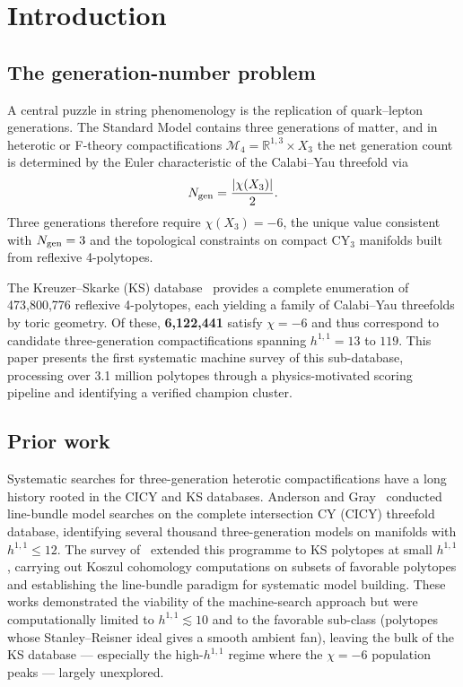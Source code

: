 \documentclass[11pt,a4paper]{article}
\newcommand{\bR}{\mathbb{R}}
\begin{document}
\section{Introduction}
\label{sec:intro}

\subsection{The generation-number problem}

A central puzzle in string phenomenology is the replication of
quark--lepton generations.
The Standard Model contains three generations of matter, and
in heterotic or F-theory compactifications
$\mathcal{M}_{4} = \bR^{1,3}\times X_3$
the net generation count is determined by the Euler characteristic
of the Calabi--Yau threefold via
\begin{equation}
  N_{\rm gen} = \frac{|\chi(X_3)|}{2}.
  \label{eq:ngen}
\end{equation}
Three generations therefore require $\chi(X_3) = -6$, the unique
value consistent with $N_{\rm gen} = 3$ and the topological
constraints on compact CY$_3$ manifolds built from
reflexive 4-polytopes.

The Kreuzer--Skarke (KS) database~\cite{KS2000} provides a
complete enumeration of 473,800,776 reflexive 4-polytopes, each
yielding a family of Calabi--Yau threefolds by toric geometry.
Of these, \textbf{6,122,441} satisfy $\chi = -6$ and thus
correspond to candidate three-generation compactifications
spanning $h^{1,1} = 13$ to $119$.
This paper presents the first systematic machine survey of this
sub-database, processing over 3.1 million polytopes through a
physics-motivated scoring pipeline and identifying a verified
champion cluster.

\subsection{Prior work}

Systematic searches for three-generation heterotic compactifications
have a long history rooted in the CICY and KS databases.
Anderson and Gray~\cite{AndersonGray2012} conducted line-bundle
model searches on the complete intersection CY (CICY) threefold
database, identifying several thousand three-generation models on
manifolds with $h^{1,1} \leq 12$.
The survey of~\cite{AGLP2014} extended this programme to KS polytopes
at small $h^{1,1}$, carrying out Koszul cohomology computations on
subsets of favorable polytopes and establishing the line-bundle paradigm
for systematic model building.
These works demonstrated the viability of the machine-search approach
but were computationally limited to $h^{1,1} \lesssim 10$ and to the
favorable sub-class (polytopes whose Stanley--Reisner ideal gives a
smooth ambient fan), leaving the bulk of the KS database --- especially
the high-$h^{1,1}$ regime where the $\chi=-6$ population
peaks --- largely unexplored.
\end{document}
